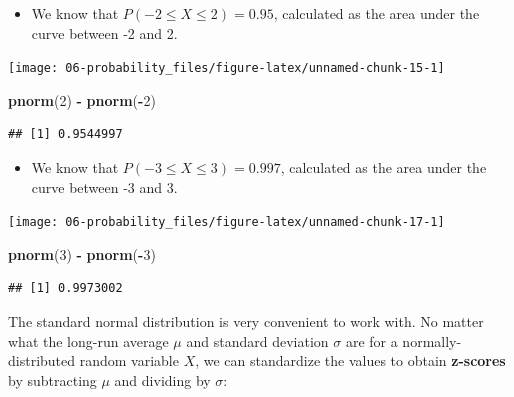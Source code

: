 \documentclass[
]{book}
\newenvironment{Shaded}{\begin{snugshade}}{\end{snugshade}}
\newcommand{\DecValTok}[1]{\textcolor[rgb]{0.00,0.00,0.81}{#1}}
\newcommand{\FunctionTok}[1]{\textcolor[rgb]{0.13,0.29,0.53}{\textbf{#1}}}
\newcommand{\NormalTok}[1]{#1}
\newcommand{\SpecialCharTok}[1]{\textcolor[rgb]{0.81,0.36,0.00}{\textbf{#1}}}
\providecommand{\tightlist}{%
  \setlength{\itemsep}{0pt}\setlength{\parskip}{0pt}}
\begin{document}
\begin{itemize}
\tightlist
\item
  We know that \(P(-2\leq X \leq 2) = 0.95\), calculated as the area under the curve between -2 and 2.
\end{itemize}

\begin{center}\texttt{[image: 06-probability\_files/figure-latex/unnamed-chunk-15-1]} \end{center}

\begin{Shaded}
\begin{Highlighting}[]
\FunctionTok{pnorm}\NormalTok{(}\DecValTok{2}\NormalTok{) }\SpecialCharTok{{-}} \FunctionTok{pnorm}\NormalTok{(}\SpecialCharTok{{-}}\DecValTok{2}\NormalTok{)}
\end{Highlighting}
\end{Shaded}

\begin{verbatim}
## [1] 0.9544997
\end{verbatim}

\begin{itemize}
\tightlist
\item
  We know that \(P(-3\leq X \leq 3) = 0.997\), calculated as the area under the curve between -3 and 3.
\end{itemize}

\begin{center}\texttt{[image: 06-probability\_files/figure-latex/unnamed-chunk-17-1]} \end{center}

\begin{Shaded}
\begin{Highlighting}[]
\FunctionTok{pnorm}\NormalTok{(}\DecValTok{3}\NormalTok{) }\SpecialCharTok{{-}} \FunctionTok{pnorm}\NormalTok{(}\SpecialCharTok{{-}}\DecValTok{3}\NormalTok{)}
\end{Highlighting}
\end{Shaded}

\begin{verbatim}
## [1] 0.9973002
\end{verbatim}

The standard normal distribution is very convenient to work with. No matter what the long-run average \(\mu\) and standard deviation \(\sigma\) are for a normally-distributed random variable \(X\), we can standardize the values to obtain \textbf{z-scores} by subtracting \(\mu\) and dividing by \(\sigma\):
\end{document}
